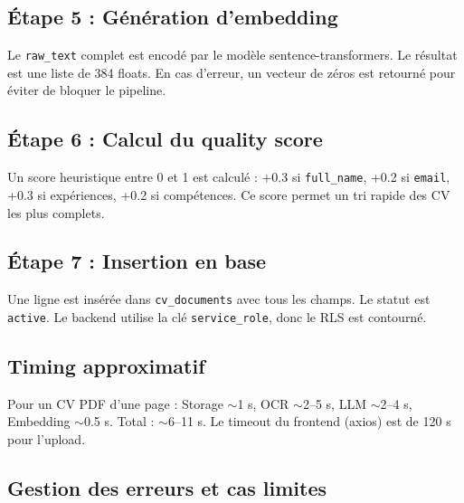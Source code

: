 \documentclass[11pt,a4paper]{report}
\begin{document}
\subsection{Étape 5 : Génération d'embedding}

Le \texttt{raw\_text} complet est encodé par le modèle sentence-transformers. Le résultat est une liste de 384 floats. En cas d'erreur, un vecteur de zéros est retourné pour éviter de bloquer le pipeline.

\subsection{Étape 6 : Calcul du quality score}

Un score heuristique entre 0 et 1 est calculé : +0.3 si \texttt{full\_name}, +0.2 si \texttt{email}, +0.3 si expériences, +0.2 si compétences. Ce score permet un tri rapide des CV les plus complets.

\subsection{Étape 7 : Insertion en base}

Une ligne est insérée dans \texttt{cv\_documents} avec tous les champs. Le statut est \texttt{active}. Le backend utilise la clé \texttt{service\_role}, donc le RLS est contourné.

\subsection{Timing approximatif}

Pour un CV PDF d'une page : Storage $\sim$1 s, OCR $\sim$2–5 s, LLM $\sim$2–4 s, Embedding $\sim$0.5 s. Total : $\sim$6–11 s. Le timeout du frontend (axios) est de 120 s pour l'upload.

\subsection{Gestion des erreurs et cas limites}
\end{document}
